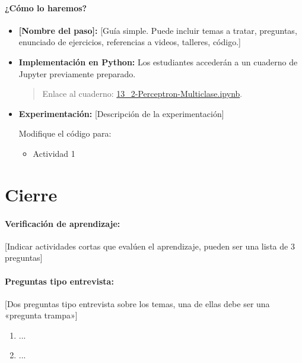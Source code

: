 \documentclass[a4,11pt]{aleph-notas}
\begin{document}
\paragraph{¿Cómo lo haremos?}  
\begin{itemize}[leftmargin=*]
    \item \textbf{[Nombre del paso]:}  %
    [Guía simple. Puede incluir temas a tratar, preguntas, enunciado de ejercicios, referencias a videos, talleres, código.]
    \item \textbf{Implementación en Python:} Los estudiantes accederán a un cuaderno de Jupyter previamente preparado.
    \begin{quote}
        Enlace al cuaderno: \href{https://github.com/andres-merino/AprendizajeAutomaticoInicial-05-N0105/blob/main/2-Notebooks/13_2-Perceptron-Multiclase.ipynb}{13\_2-Perceptron-Multiclase.ipynb}.
    \end{quote}
    \item \textbf{Experimentación:} 
    [Descripción de la experimentación]
    \begin{ejer}
    Modifique el código para:
    \begin{itemize}[leftmargin=*]
        \item Actividad 1
    \end{itemize}
    \end{ejer}
\end{itemize}

\section*{Cierre}

\paragraph{Verificación de aprendizaje:} [Indicar actividades cortas que evalúen el aprendizaje, pueden ser una lista de 3 preguntas]

\paragraph{Preguntas tipo entrevista:} [Dos preguntas tipo entrevista sobre los temas, una de ellas debe ser una «pregunta trampa»]
\begin{enumerate}[leftmargin=*]
    \item ...
    \item ...
\end{enumerate}
\end{document}
